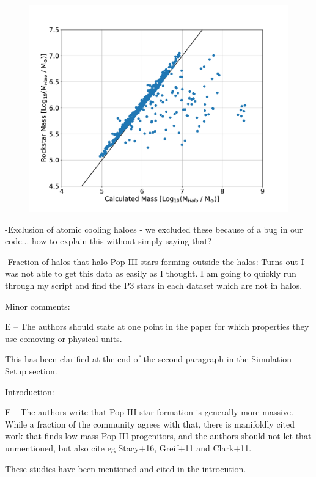 \documentclass[11pt]{article}
\newenvironment{referee}[1][]{%
    \ignorespaces%
    \begin{mdframed}[style=myquotestyle,#1]%
}{%
    \end{mdframed}%
    \ignorespacesafterend%
}%
\begin{document}
\begin{figure}[H]
	\centering
	\includegraphics[keepaspectratio=true, scale=0.5]{images/compare_halo_mass.pdf}
    \label{fig:compare_mass}
\end{figure}

-Exclusion of atomic cooling haloes - we excluded these because of a bug in our code... how to explain this without simply saying that?

-Fraction of halos that halo Pop III stars forming outside the halos: Turns out I was not able to get this data as easily as I thought. I am going to quickly run through my script and find the P3 stars in each dataset which are not in halos.

\begin{referee}
Minor comments:

E -- The authors should state at one point in the paper for which properties they use comoving or physical units.
\end{referee}
This has been clarified at the end of the second paragraph in the Simulation Setup section.

\begin{referee}
Introduction:

F -- The authors write that Pop III star formation is generally more massive. While a fraction of the community agrees with that, there is manifoldly cited work that finds low-mass Pop III progenitors, and the authors should not let that unmentioned, but also cite eg Stacy+16, Greif+11 and Clark+11.
\end{referee}
These studies have been mentioned and cited in the introcution.
\end{document}
